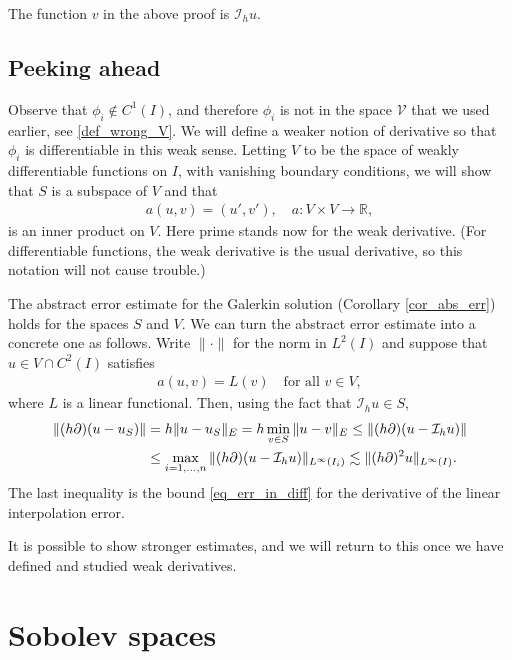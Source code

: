 \documentclass[12pt,oneside]{amsart}
\def\I{\mathcal I}
\begin{document}
\begin{remark}\label{rem_Ih}
The function $v$ in the above proof is $\I_h u$.
\end{remark}

\subsection{Peeking ahead\label{sec_peek}}

Observe that $\phi_i \notin C^1(I)$, and therefore $\phi_i$ is not in the space $\mathcal V$
that we used earlier, see \eqref{def_wrong_V}. We will define a weaker notion of derivative so that $\phi_i$ is differentiable in this weak sense. Letting $V$ to be the space of weakly differentiable functions on $I$, with vanishing boundary conditions, 
we will show that $S$ is a subspace of $V$ and that 
    \begin{align*}
a(u, v) = (u', v'), \quad a : V \times V \to \mathbb R,
    \end{align*}
is an inner product on $V$. Here prime stands now for the weak derivative. (For differentiable functions, the weak derivative is the usual derivative, so this notation will not cause trouble.)

The abstract error estimate for the Galerkin solution (Corollary \ref{cor_abs_err}) holds for the spaces $S$ and $V$. 
We can turn the abstract error estimate into a concrete one as follows. Write $\|\cdot\|$ for the norm in $L^2(I)$ and suppose that $u \in V \cap C^2(I)$ satisfies
    \begin{align*}
a(u, v) = L(v) \quad \text{for all $v \in V$},
    \end{align*}
where $L$ is a linear functional.
Then, using the fact that $\I_h u \in S$,
    \begin{align}\label{eq_err_peek}
\|(h\partial)(u-u_S)\|
&= 
h\|u-u_S\|_E 
= 
h \min_{v \in S}\|u-v\|_E
\le 
\|(h\partial)(u-\I_h u)\|
\\\notag&\le
\max_{i=1,\dots,n}\|(h\partial)(u - \I_h u)\|_{L^\infty(I_i)} 
\lesssim\|(h \partial)^2 u\|_{L^\infty(I)}.
    \end{align}
The last inequality is the bound \eqref{eq_err_in_diff} for the derivative of the linear interpolation error.

It is possible to show stronger estimates, and we will return to this once we have defined and studied weak derivatives. 

\section{Sobolev spaces}
\end{document}
